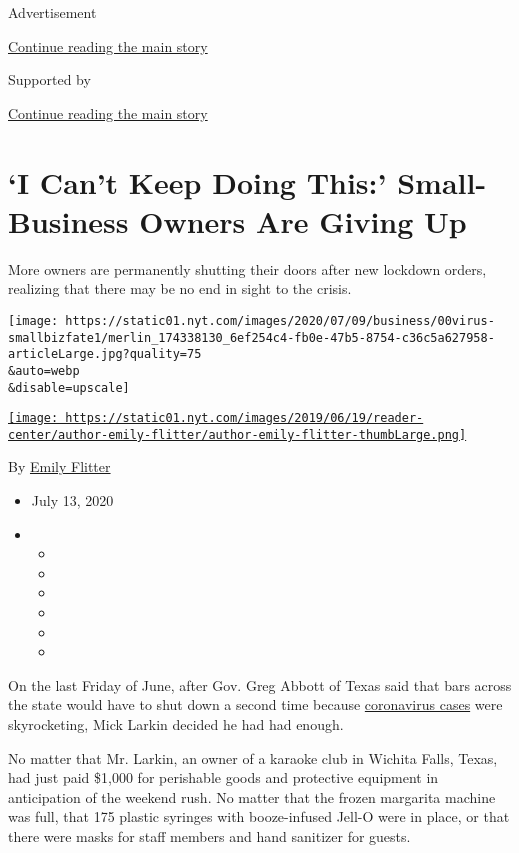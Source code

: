 Advertisement

\protect\hyperlink{after-top}{Continue reading the main story}

Supported by

\protect\hyperlink{after-sponsor}{Continue reading the main story}

\hypertarget{i-cant-keep-doing-this-small-business-owners-are-giving-up}{%
\section{`I Can't Keep Doing This:' Small-Business Owners Are Giving
Up}\label{i-cant-keep-doing-this-small-business-owners-are-giving-up}}

More owners are permanently shutting their doors after new lockdown
orders, realizing that there may be no end in sight to the crisis.

\texttt{[image: https://static01.nyt.com/images/2020/07/09/business/00virus-smallbizfate1/merlin\_174338130\_6ef254c4-fb0e-47b5-8754-c36c5a627958-articleLarge.jpg?quality=75\\\&auto=webp\\\&disable=upscale]}

\href{https://www.nytimes.com/by/emily-flitter}{\texttt{[image: https://static01.nyt.com/images/2019/06/19/reader-center/author-emily-flitter/author-emily-flitter-thumbLarge.png]}}

By \href{https://www.nytimes.com/by/emily-flitter}{Emily Flitter}

\begin{itemize}
\item
  July 13, 2020
\item
  \begin{itemize}
  \item
  \item
  \item
  \item
  \item
  \item
  \end{itemize}
\end{itemize}

On the last Friday of June, after Gov. Greg Abbott of Texas said that
bars across the state would have to shut down a second time because
\href{https://www.nytimes.com/news-event/coronavirus}{coronavirus cases}
were skyrocketing, Mick Larkin decided he had had enough.

No matter that Mr. Larkin, an owner of a karaoke club in Wichita Falls,
Texas, had just paid \$1,000 for perishable goods and protective
equipment in anticipation of the weekend rush. No matter that the frozen
margarita machine was full, that 175 plastic syringes with booze-infused
Jell-O were in place, or that there were masks for staff members and
hand sanitizer for guests.


